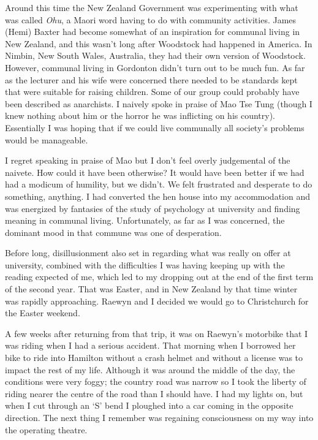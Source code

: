 \enlargethispage{\baselineskip}

Around this time the New Zealand Government was experimenting with what
was called \emph{Ohu}\cite{ohu}, a Maori word having to do with community activities. James
(Hemi) Baxter had become somewhat of an inspiration for communal living in New
Zealand, and this wasn't long after Woodstock had happened in America.
In Nimbin, New South Wales, Australia, they had their own version of
Woodstock. However, communal living in Gordonton didn't turn out to be
much fun. As far as the lecturer and his wife were concerned there
needed to be standards kept that were suitable for raising children.
Some of our group could probably have been described as anarchists. I
naively spoke in praise of Mao Tse Tung (though I knew nothing about him
or the horror he was inflicting on his country). Essentially I was
hoping that if we could live communally all society's problems would be
manageable.

I regret speaking in praise of Mao but I don't feel overly judgemental
of the naivete. How could it have been otherwise? It would have been
better if we had had a modicum of humility, but we didn't. We felt
frustrated and desperate to do something, anything. I had converted the
hen house into my accommodation and was energized by fantasies of the
study of psychology at university and finding meaning in communal
living. Unfortunately, as far as I was concerned, the dominant mood in
that commune was one of desperation.

Before long, disillusionment also set in regarding what was really on
offer at university, combined with the difficulties I was having keeping
up with the reading expected of me, which led to my dropping out at the
end of the first term of the second year. That was Easter, and in New
Zealand by that time winter was rapidly approaching. Raewyn and I
decided we would go to Christchurch for the Easter weekend.

\enlargethispage{\baselineskip}

A few weeks after returning from that trip, it was on Raewyn's motorbike
that I was riding when I had a serious accident. That morning when I
borrowed her bike to ride into Hamilton without a crash helmet and
without a license was to impact the rest of my life. Although it was
around the middle of the day, the conditions were very foggy; the
country road was narrow so I took the liberty of riding nearer the
centre of the road than I should have. I had my lights on, but when I
cut through an `S' bend I ploughed into a car coming in the opposite
direction. The next thing I remember was regaining consciousness on my
way into the operating theatre.

